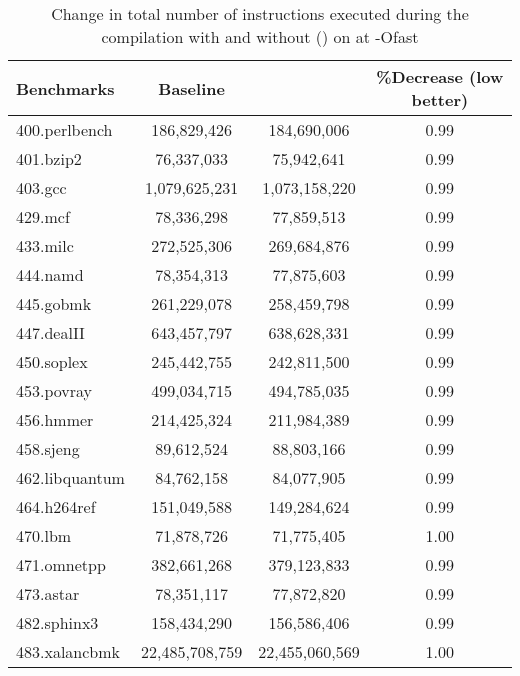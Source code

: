 \documentclass[acmlarge,review,anonymous]{acmart}\settopmatter{printfolios=true}
\begin{document}
\begin{table}[h]
  \begin{center}
    \begin{tabular}{|l|c|c|c|}
      \hline
  Benchmarks      &   Baseline	        & \GCM{}           & \%Decrease (low better) \\\hline
  400.perlbench	  &   186,829,426	& 184,690,006	& 0.99 \\\hline
  401.bzip2	  &   76,337,033	& 75,942,641	& 0.99 \\\hline
  403.gcc         &   1,079,625,231	& 1,073,158,220	& 0.99 \\\hline
  429.mcf         &   78,336,298	& 77,859,513	& 0.99 \\\hline
  433.milc	  &   272,525,306	& 269,684,876	& 0.99 \\\hline
  444.namd	  &   78,354,313	& 77,875,603	& 0.99 \\\hline
  445.gobmk	  &   261,229,078	& 258,459,798	& 0.99 \\\hline
  447.dealII	  &   643,457,797	& 638,628,331	& 0.99 \\\hline
  450.soplex	  &   245,442,755	& 242,811,500	& 0.99 \\\hline
  453.povray	  &   499,034,715	& 494,785,035	& 0.99 \\\hline
  456.hmmer	  &   214,425,324	& 211,984,389	& 0.99 \\\hline
  458.sjeng	  &   89,612,524	& 88,803,166	& 0.99 \\\hline
  462.libquantum  &   84,762,158	& 84,077,905	& 0.99 \\\hline
  464.h264ref	  &   151,049,588	& 149,284,624	& 0.99 \\\hline
  470.lbm         &   71,878,726	& 71,775,405	& 1.00 \\\hline
  471.omnetpp	  &   382,661,268	& 379,123,833	& 0.99 \\\hline
  473.astar	  &   78,351,117	& 77,872,820	& 0.99 \\\hline
  482.sphinx3	  &   158,434,290	& 156,586,406	& 0.99 \\\hline
  483.xalancbmk	  &   22,485,708,759	& 22,455,060,569& 1.00 \\\hline
    \end{tabular}
  \end{center}
  \caption{Change in total number of instructions executed during the
    compilation with and without \gcm{} (\GCM{}) on \SPEC{} at -Ofast}
  \label{tab:compile-time}
\end{table}
\end{document}
